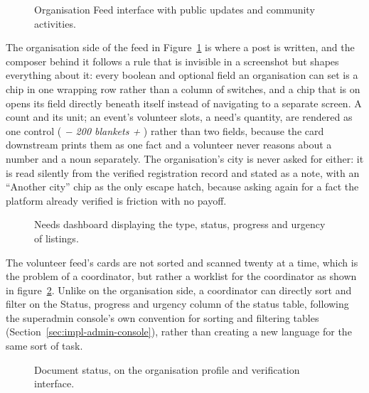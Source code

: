 \begin{figure}[H]
\centering
{}
\caption{Organisation Feed interface with public updates and community activities.}
\label{fig:organisation-feed}
\end{figure}
\clearpage
\noindent The organisation side of the feed in Figure~\ref{fig:organisation-feed} is where a post is written, and the composer behind it follows a rule that is invisible in a screenshot but shapes everything about it: every boolean and optional field an organisation can set is a chip in one wrapping row rather than a column of switches, and a chip that is on opens its field directly beneath itself instead of navigating to a separate screen. A count and its unit; an event's volunteer slots, a need's quantity, are rendered as one control (\emph{ − 200 blankets + }) rather than two fields, because the card downstream prints them as one fact and a volunteer never reasons about a number and a noun separately. The organisation's city is never asked for either: it is read silently from the verified registration record and stated as a note, with an ``Another city'' chip as the only escape hatch, because asking again for a fact the platform already verified is friction with no payoff.
\vspace{0.3pt}
\begin{figure}[H]
\centering
{}
\caption{Needs dashboard displaying the type, status, progress and urgency of listings.}
\label{fig:needs-management}
\end{figure}
\vspace{0.3pt}

\noindent  The volunteer feed's cards are not sorted and scanned twenty at a time, which is the problem of a coordinator, but rather a worklist for the coordinator as shown in figure~\ref{fig:needs-management}. Unlike on the organisation side, a coordinator can directly sort and filter on the Status, progress and urgency column of the status table, following the superadmin console's own convention for sorting and filtering tables (Section~\ref{sec:impl-admin-console}), rather than creating a new language for the same sort of task.

\begin{figure}[H]
\centering
{}
\caption{Document status, on the organisation profile and verification interface.}
\label{fig:org-verification}
\end{figure}

